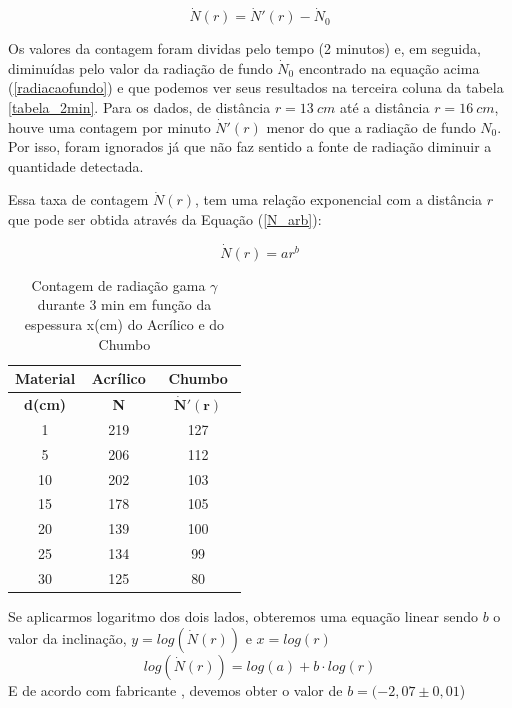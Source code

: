 \documentclass{article}
\begin{document}
\begin{equation}
    \label{eq_sem_abs}
    \dot N(r) = \dot N'(r) - \dot N _0
\end{equation}

Os valores da contagem foram dividas pelo tempo (2 minutos) e, em seguida, diminuídas pelo valor da radiação de fundo $\dot N _0$ encontrado na equação acima (\ref{radiacaofundo}) e que podemos ver seus resultados na terceira coluna da tabela \ref{tabela_2min}.  Para os dados, de distância $r = 13 \ cm$ até a distância $r = 16 \ cm$, houve uma contagem por minuto $\dot N'(r)$ menor do que a radiação de fundo $N _0$. Por isso, foram ignorados já que não faz sentido a fonte de radiação diminuir a quantidade detectada.

Essa taxa de contagem $\dot N(r)$, tem uma relação exponencial com a distância $r$ que pode ser obtida através da Equação (\ref{N_arb}):


\begin{equation}
    \label{N_arb}
    \dot N(r) = ar^b
\end{equation}

\begin{table}
    \centering
    \begin{tabular}{|c|c|c|}
    \hline
    \cellcolor{cinzaclaro}\textbf{Material} & \cellcolor{cinzaclaro}\textbf{Acrílico} & \cellcolor{cinzaclaro}\textbf{Chumbo} \\ \hline
\cellcolor[HTML]{CFCFCF}\textbf{d(cm)} & \cellcolor[HTML]{CFCFCF}~ ~ \textbf{N} ~ ~  & \cellcolor[HTML]{CFCFCF}~ {$\mathbf{\dot N'(r)}$}  ~  \\ \hline
1     & 219         & 127         \\ \hline
5     & 206         & 112         \\ \hline
10   & 202          & 103         \\ \hline
15    & 178         & 105         \\ \hline
20    & 139         & 100         \\ \hline
25    & 134         & 99          \\ \hline
30    & 125         & 80          \\ \hline
    \end{tabular}
    \caption{Contagem de radiação gama $\gamma$ durante 3 min em função da espessura x(cm) do Acrílico e do Chumbo }
    \label{tabela_absorvedor}
\end{table}

Se aplicarmos logaritmo dos dois lados, obteremos uma equação linear sendo $b$ o valor da inclinação, $y=log(\dot N(r))$ e $ x = log(r)$ 
\begin{equation}
	log (\dot N(r)) = log(a) + b \cdot log(r)
\end{equation}
E de acordo com fabricante \cite{fisicaexpV}, devemos obter o valor de $b = (-2,07 \pm 0,01$)
\end{document}

